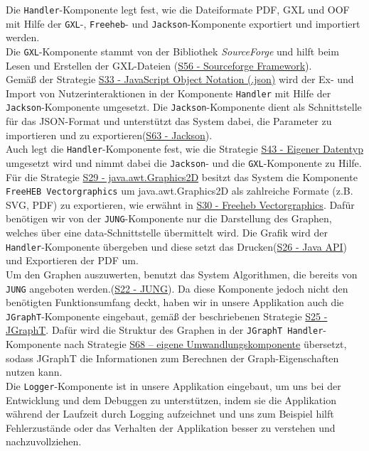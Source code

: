 \documentclass[enabledeprecatedfontcommands,fontsize=11pt,paper=a4,twoside]{scrartcl}
\newcounter{one}
\begin{document}
	Die \texttt{Handler}-Komponente legt fest, wie die Dateiformate PDF, GXL und OOF mit Hilfe der \texttt{GXL}-, \texttt{Freeheb}- und \texttt{Jackson}-Komponente exportiert und importiert werden. \\
	Die \texttt{GXL}-Komponente stammt von der Bibliothek \textit{SourceForge} und hilft beim Lesen und Erstellen der GXL-Dateien (\hyperlink{ttt}{S56 - Sourceforge Framework}). \\
	Gemäß der Strategie \hyperlink{jjj}{S33 - JavaScript Object Notation (.json)} wird der Ex- und Import von Nutzerinteraktionen in der Komponente \texttt{Handler} mit Hilfe der \texttt{Jackson}-Komponente umgesetzt. Die \texttt{Jackson}-Komponente dient als Schnittstelle für das JSON-Format und unterstützt das System dabei, die Parameter zu importieren und zu exportieren(\hyperlink{www}{S63 - Jackson}).\\
	Auch legt die \texttt{Handler}-Komponente fest, wie die Strategie \hyperlink{ooo}{S43 - Eigener Datentyp} umgesetzt wird und nimmt dabei die \texttt{Jackson}- und die \texttt{GXL}-Komponente zu Hilfe. \\
	Für die Strategie \hyperlink{hhh}{S29 - java.awt.Graphics2D} besitzt das System die Komponente\\ \texttt{FreeHEB Vectorgraphics} um java.awt.Graphics2D als zahlreiche Formate (z.B. SVG, PDF) zu exportieren, wie erwähnt in \hyperlink{iii}{S30 - Freeheb Vectorgraphics}. Dafür benötigen wir von der \texttt{JUNG}-Komponente nur die Darstellung des Graphen, welches über eine data-Schnittstelle übermittelt wird. Die Grafik wird der \texttt{Handler}-Komponente übergeben und diese setzt das Drucken(\hyperlink{ggg}{S26 - Java API}) und Exportieren der PDF um. \\ 
	
	Um den Graphen auszuwerten, benutzt das System Algorithmen, die bereits von \texttt{JUNG} angeboten werden.(\hyperlink{fff}{S22 - JUNG}). Da diese Komponente jedoch nicht den benötigten Funktionsumfang deckt, haben wir in unsere Applikation auch die \texttt{JGraphT}-Komponente eingebaut, gemäß der beschriebenen Strategie  \hyperlink{xxx}{S25 - JGraphT}. Dafür wird die Struktur des Graphen in der \texttt{JGraphT Handler}-Komponente nach Strategie \hyperlink{umwandlungskomponente}{S68 – eigene Umwandlungskomponente} übersetzt, sodass JGraphT die Informationen zum Berechnen der Graph-Eigenschaften nutzen kann. \\ 
	
	Die \texttt{Logger}-Komponente ist in unsere Applikation eingebaut, um uns bei der Entwicklung und dem Debuggen zu unterstützen, indem sie die Applikation während der Laufzeit durch Logging aufzeichnet und uns zum Beispiel hilft Fehlerzustände oder das Verhalten der Applikation besser zu verstehen und nachzuvollziehen.\\ \\
	\newpage
	
	
\end{document}
